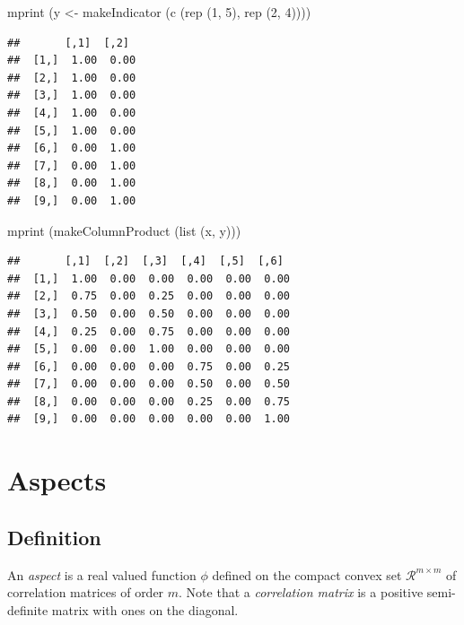\documentclass[
  12pt,
]{book}
\newenvironment{Shaded}{\begin{snugshade}}{\end{snugshade}}
\newcommand{\DecValTok}[1]{\textcolor[rgb]{0.00,0.00,0.81}{#1}}
\newcommand{\FunctionTok}[1]{\textcolor[rgb]{0.00,0.00,0.00}{#1}}
\newcommand{\NormalTok}[1]{#1}
\newcommand{\OtherTok}[1]{\textcolor[rgb]{0.56,0.35,0.01}{#1}}
\begin{document}
\begin{Shaded}
\begin{Highlighting}[]
\FunctionTok{mprint}\NormalTok{ (y }\OtherTok{\textless{}{-}} \FunctionTok{makeIndicator}\NormalTok{ (}\FunctionTok{c}\NormalTok{ (}\FunctionTok{rep}\NormalTok{ (}\DecValTok{1}\NormalTok{, }\DecValTok{5}\NormalTok{), }\FunctionTok{rep}\NormalTok{ (}\DecValTok{2}\NormalTok{, }\DecValTok{4}\NormalTok{))))}
\end{Highlighting}
\end{Shaded}

\begin{verbatim}
##       [,1]  [,2] 
##  [1,]  1.00  0.00
##  [2,]  1.00  0.00
##  [3,]  1.00  0.00
##  [4,]  1.00  0.00
##  [5,]  1.00  0.00
##  [6,]  0.00  1.00
##  [7,]  0.00  1.00
##  [8,]  0.00  1.00
##  [9,]  0.00  1.00
\end{verbatim}

\begin{Shaded}
\begin{Highlighting}[]
\FunctionTok{mprint}\NormalTok{ (}\FunctionTok{makeColumnProduct}\NormalTok{ (}\FunctionTok{list}\NormalTok{ (x, y)))}
\end{Highlighting}
\end{Shaded}

\begin{verbatim}
##       [,1]  [,2]  [,3]  [,4]  [,5]  [,6] 
##  [1,]  1.00  0.00  0.00  0.00  0.00  0.00
##  [2,]  0.75  0.00  0.25  0.00  0.00  0.00
##  [3,]  0.50  0.00  0.50  0.00  0.00  0.00
##  [4,]  0.25  0.00  0.75  0.00  0.00  0.00
##  [5,]  0.00  0.00  1.00  0.00  0.00  0.00
##  [6,]  0.00  0.00  0.00  0.75  0.00  0.25
##  [7,]  0.00  0.00  0.00  0.50  0.00  0.50
##  [8,]  0.00  0.00  0.00  0.25  0.00  0.75
##  [9,]  0.00  0.00  0.00  0.00  0.00  1.00
\end{verbatim}

\hypertarget{aspects}{%
\chapter{Aspects}\label{aspects}}

\hypertarget{definition}{%
\section{Definition}\label{definition}}

An \emph{aspect} is a real valued function \(\phi\) defined on the compact convex set \(\mathcal{R}^{m\times m}\) of correlation matrices of order \(m\). Note that a \emph{correlation matrix} is a positive semi-definite matrix with ones on the diagonal.
\end{document}

